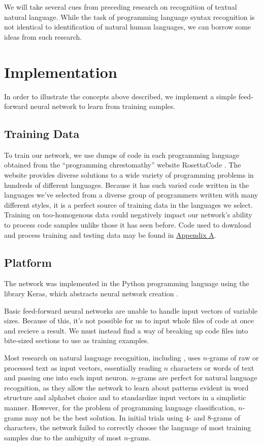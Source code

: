 \documentclass{article}
\begin{document}
We will take several cues from preceding research on recognition of textual natural language. While the task of programming language syntax recognition is not identical to identification of natural human languages, we can borrow some ideas from such research.

\section{Implementation}
In order to illustrate the concepts above described, we implement a simple feed-forward neural network to learn from training samples.

\subsection{Training Data}
To train our network, we use dumps of code in each programming language obtained from the ``programming chrestomathy'' website RosettaCode \cite{rosettacode}. The website provides diverse solutions to a wide variety of programming problems in hundreds of different languages. Because it has such varied code written in the languages we've selected from a diverse group of programmers written with many different styles, it is a perfect source of training data in the languages we select. Training on too-homogenous data could negatively impact our network's ability to process code samples unlike those it has seen before. Code used to download and process training and testing data may be found in  \hyperref[sec:appendix_a]{Appendix A}.
\subsection{Platform}
The network was implemented in the Python programming language using the library Keras, which abstracts neural network creation \cite{keras}.

Basic feed-forward neural networks are unable to handle input vectors of variable sizes. Because of this, it's not possible for us to input whole files of code at once and recieve a result. We must instead find a way of breaking up code files into bite-sized sections to use as training examples.

Most research on natural language recognition, including \cite{langidstanford}, uses $n$-grams of raw or processed text as input vectors, essentially reading $n$ characters or words of text and passing one into each input neuron. $n$-grams are perfect for natural language recognition, as they allow the network to learn about patterns evident in word structure and alphabet choice and to standardize input vectors in a simplistic manner. However, for the problem of programming language classification, $n$-grams may not be the best solution. In initial trials using $4$- and $8$-grams of characters, the network failed to correctly choose the language of most training samples due to the ambiguity of most $n$-grams.
\end{document}
